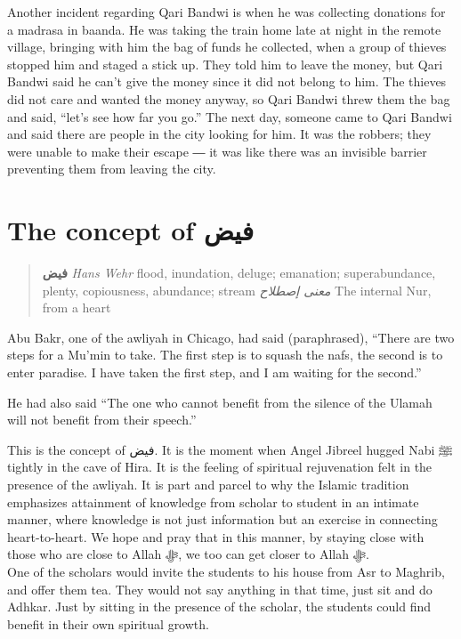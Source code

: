 \documentclass[]{book}
\begin{document}
Another incident regarding Qari Bandwi is when he was collecting donations for a madrasa in baanda. He was taking the train home late at night in the remote village, bringing with him the bag of funds he collected, when a group of thieves stopped him and staged a stick up. They told him to leave the money, but Qari Bandwi said he can't give the money since it did not belong to him. The thieves did not care and wanted the money anyway, so Qari Bandwi threw them the bag and said, ``let's see how far you go.'' The next day, someone came to Qari Bandwi and said there are people in the city looking for him. It was the robbers; they were unable to make their escape ― it was like there was an invisible barrier preventing them from leaving the city.

\hypertarget{the-concept-of-ux641ux64aux636}{%
\section{The concept of فيض}\label{the-concept-of-ux641ux64aux636}}

\begin{quote}
\textbf{فيض}
\emph{Hans Wehr} flood, inundation, deluge; emanation; superabundance, plenty, copiousness, abundance; stream
\emph{معنى إصطلاح} The internal Nur, from a heart
\end{quote}

Abu Bakr, one of the awliyah in Chicago, had said (paraphrased), ``There are two steps for a Mu'min to take. The first step is to squash the nafs, the second is to enter paradise. I have taken the first step, and I am waiting for the second.''

He had also said ``The one who cannot benefit from the silence of the Ulamah will not benefit from their speech.''

This is the concept of فيض. It is the moment when Angel Jibreel hugged Nabi ﷺ tightly in the cave of Hira. It is the feeling of spiritual rejuvenation felt in the presence of the awliyah. It is part and parcel to why the Islamic tradition emphasizes attainment of knowledge from scholar to student in an intimate manner, where knowledge is not just information but an exercise in connecting heart-to-heart. We hope and pray that in this manner, by staying close with those who are close to Allah ﷻ, we too can get closer to Allah ﷻ.\\
One of the scholars would invite the students to his house from Asr to Maghrib, and offer them tea. They would not say anything in that time, just sit and do Adhkar. Just by sitting in the presence of the scholar, the students could find benefit in their own spiritual growth.
\end{document}
